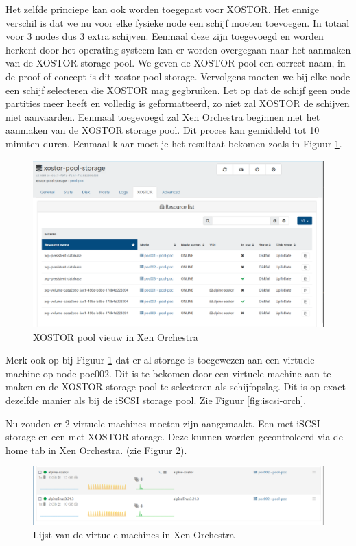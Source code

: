Het zelfde princiepe kan ook worden toegepast voor XOSTOR. Het ennige verschil is dat we nu voor elke fysieke node een schijf moeten toevoegen. In totaal voor 3 nodes dus 3 extra schijven.
Eenmaal deze zijn toegevoegd en worden herkent door het operating systeem kan er worden overgegaan naar het aanmaken van de XOSTOR storage pool.
We geven de XOSTOR pool een correct naam, in de proof of concept is dit xostor-pool-storage. Vervolgens moeten we bij elke node een schijf selecteren die XOSTOR mag gegbruiken.
Let op dat de schijf geen oude partities meer heeft en volledig is geformatteerd, zo niet zal XOSTOR de schijven niet aanvaarden. Eenmaal toegevoegd zal Xen Orchestra beginnen met het aanmaken van de XOSTOR storage pool.
Dit proces kan gemiddeld tot 10 minuten duren. Eenmaal klaar moet je het resultaat bekomen zoals in Figuur \ref{fig:xostor-pool-orch}.
\begin{figure}[H]
  \centering
  \includegraphics[width=1.0\textwidth, trim=0cm 0cm 13cm 0cm, clip]{../poc/xostor-vieuw-orch.png}
  \caption{XOSTOR pool vieuw in Xen Orchestra}
  \label{fig:xostor-pool-orch}    
\end{figure}
Merk ook op bij Figuur \ref{fig:xostor-pool-orch} dat er al storage is toegewezen aan een virtuele machine op node poc002. Dit is te bekomen door een virtuele machine aan te maken en de XOSTOR storage pool te selecteren als schijfopslag.
Dit is op exact dezelfde manier als bij de iSCSI storage pool. Zie Figuur \ref{fig:iscsi-orch}.

Nu zouden er 2 virtuele machines moeten zijn aangemaakt. Een met iSCSI storage en een met XOSTOR storage. Deze kunnen worden gecontroleerd via de home tab in Xen Orchestra. (zie Figuur \ref{fig:virtuelemachines-orch}).
\begin{figure}[H]
  \centering
  \includegraphics[width=1.0\textwidth, trim=0cm 0cm 17cm 0cm, clip]{../poc/virtuelemachines-orch.png}
  \caption{Lijst van de virtuele machines in Xen Orchestra}
  \label{fig:virtuelemachines-orch}  
\end{figure}

